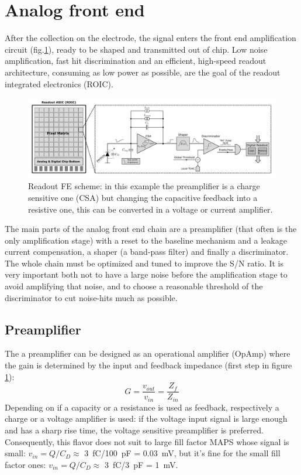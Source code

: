 \section{Analog front end}
   After the collection on the electrode, the signal enters the front end amplification circuit (fig.\ref{fig:readout_scheme}), ready to be shaped and transmitted out of chip. Low noise amplification, fast hit discrimination and an efficient, high-speed readout architecture, consuming as low power as possible, are the goal of the readout integrated electronics (ROIC).
   \begin{figure}
      \centering
      \includegraphics[width=1.\linewidth]{figures/Pixel_detectors/readout_scheme.png}
      \caption{Readout FE scheme: in this example the preamplifier is a charge sensitive one (CSA) but changing the capacitive feedback into a resistive one, this can be converted in a voltage or current amplifier.}
      \label{fig:readout_scheme}
   \end{figure}
   The main parts of the analog front end chain are a preamplifier (that often is the only amplification stage) with a reset to the baseline mechanism and a leakage current compensation, a shaper (a band-pass filter) and finally a discriminator. The whole chain must be optimized and tuned to improve the S/N ratio. It is very important both not to have a large noise before the amplification stage to avoid amplifying that noise, and to choose a reasonable threshold of the discriminator to cut noise-hits much as possible.

   \subsection{Preamplifier}\label{subsec:preamplifier}
      The a preamplifier can be designed as an operational amplifier (OpAmp) where the gain is determined by the input and feedback impedance (first step in figure \ref{fig:readout_scheme}):
      \begin{equation}
         G = \frac{v_{out}}{v_{in}} = \frac{Z_{f}}{Z_{in}}
      \end{equation}
      Depending on if a capacity or a resistance is used as feedback, respectively a charge or a voltage amplifier is used: if the voltage input signal is large enough and has a sharp rise time, the voltage sensitive preamplifier is preferred. Consequently, this flavor does not suit to large fill factor MAPS whose signal is small: $v_{in} = Q/C_{D} \approx$ \SI{3}{fC}/\SI{100}{pF} = \SI{0.03}{mV}, but it's fine for the small fill factor ones: $v_{in} = Q/C_{D} \approx$ \SI{3}{fC}/\SI{3}{pF} = \SI{1}{mV}.

